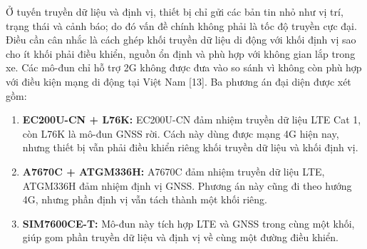 \documentclass[a4paper]{extarticle}
\providecommand{\tightlist}{%
  \setlength{\itemsep}{0pt}\setlength{\parskip}{0pt}}
\begin{document}
Ở tuyến truyền dữ liệu và định vị, thiết bị chỉ gửi các bản tin nhỏ như vị trí, trạng thái và cảnh báo; do đó vấn đề chính không phải là tốc độ truyền cực đại. Điều cần cân nhắc là cách ghép khối truyền dữ liệu di động với khối định vị sao cho ít khối phải điều khiển, nguồn ổn định và phù hợp với không gian lắp trong xe. Các mô-đun chỉ hỗ trợ 2G không được đưa vào so sánh vì không còn phù hợp với điều kiện mạng di động tại Việt Nam {[}13{]}. Ba phương án đại diện được xét gồm:

\begin{enumerate}
\def\labelenumi{\arabic{enumi}.}
\tightlist
\item
  \textbf{EC200U-CN + L76K:} EC200U-CN đảm nhiệm truyền dữ liệu LTE Cat 1, còn L76K là mô-đun GNSS rời. Cách này dùng được mạng 4G hiện nay, nhưng thiết bị vẫn phải điều khiển riêng khối truyền dữ liệu và khối định vị.
\item
  \textbf{A7670C + ATGM336H:} A7670C đảm nhiệm truyền dữ liệu LTE, ATGM336H đảm nhiệm định vị GNSS. Phương án này cũng đi theo hướng 4G, nhưng phần định vị vẫn tách thành một khối riêng.
\item
  \textbf{SIM7600CE-T:} Mô-đun này tích hợp LTE và GNSS trong cùng một khối, giúp gom phần truyền dữ liệu và định vị về cùng một đường điều khiển.
\end{enumerate}
\end{document}
